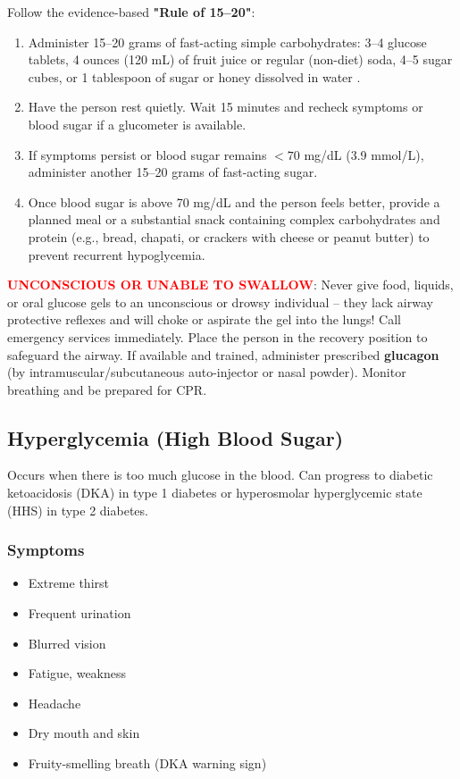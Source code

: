 Follow the evidence-based \textbf{"Rule of 15--20"}:
\begin{enumerate}[leftmargin=*]
\item Administer 15--20 grams of fast-acting simple carbohydrates: 3--4 glucose tablets, 4 ounces (120 mL) of fruit juice or regular (non-diet) soda, 4--5 sugar cubes, or 1 tablespoon of sugar or honey dissolved in water \cite{aha_arc_2024}.
\item Have the person rest quietly. Wait 15 minutes and recheck symptoms or blood sugar if a glucometer is available.
\item If symptoms persist or blood sugar remains $<70$ mg/dL (3.9 mmol/L), administer another 15--20 grams of fast-acting sugar.
\item Once blood sugar is above 70 mg/dL and the person feels better, provide a planned meal or a substantial snack containing complex carbohydrates and protein (e.g., bread, chapati, or crackers with cheese or peanut butter) to prevent recurrent hypoglycemia.
\end{enumerate}
\noindent\textbf{\textcolor{red}{UNCONSCIOUS OR UNABLE TO SWALLOW}}: Never give food, liquids, or oral glucose gels to an unconscious or drowsy individual -- they lack airway protective reflexes and will choke or aspirate the gel into the lungs! Call emergency services immediately. Place the person in the recovery position to safeguard the airway. If available and trained, administer prescribed \textbf{glucagon} (by intramuscular/subcutaneous auto-injector or nasal powder). Monitor breathing and be prepared for CPR.

\subsection{Hyperglycemia (High Blood Sugar)}

Occurs when there is too much glucose in the blood. Can progress to diabetic ketoacidosis (DKA) in type 1 diabetes or hyperosmolar hyperglycemic state (HHS) in type 2 diabetes.

\subsubsection{Symptoms}

\begin{itemize}[leftmargin=*]
  \item Extreme thirst
  \item Frequent urination
  \item Blurred vision
  \item Fatigue, weakness
  \item Headache
  \item Dry mouth and skin
  \item Fruity-smelling breath (DKA warning sign)
\end{itemize}

